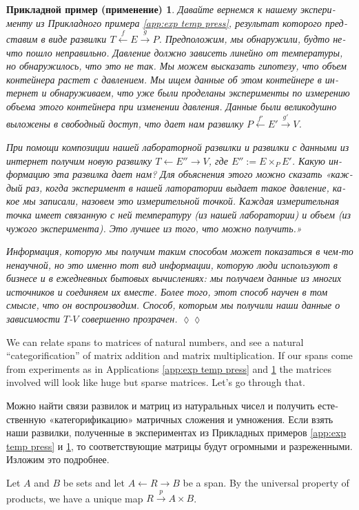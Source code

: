 \documentclass[a4paper]{book}
\def\to{\rightarrow}
\def\from{\leftarrow}
\newcommand{\To}[1]{\xrightarrow{#1}}
\newcommand{\From}[1]{\xleftarrow{#1}}
\theoremstyle{myth}
\newtheorem{appRUS}[envRUS]{Прикладной пример (применение)}
\newenvironment{applicationRUS}{\begin{appRUS}}{\hspace*{\fill}$\lozenge\lozenge$\end{appRUS}}
\begin{document}
\begin{russian}
\begin{applicationRUS}\label{app:exp temp press 2}
Давайте вернемся к нашему эксперименту из Прикладного примера \ref{app:exp temp press}, результат которого представим в виде развилки $T\From{f}E\To{g}P$. Предположим, мы обнаружили, будто нечто пошло неправильно. Давление должно зависеть линейно от температуры, но обнаружилось, что это не так. Мы можем высказать гипотезу, что объем контейнера растет с давлением. Мы ищем данные об этом контейнере в интернет и обнаруживаем, что уже были проделаны эксперименты по измерению объема этого контейнера при изменении давления. Данные были великодушно выложены в свободный доступ, что дает нам развилку $P\From{f'}E'\To{g'}V$. 

При помощи композиции нашей лабораторной развилки и развилки с данными из интернет получим новую развилку $T\from E''\to V$, где $E'':=E\times_PE'$. Какую информацию эта развилка дает нам? Для объяснения этого можно сказать «каждый раз, когда эксперимент в нашей латоратории выдает такое давление, какое мы записали, назовем это измерительной точкой. Каждая измерительная точка имеет связанную с ней температуру (из нашей лаборатории) и объем (из чужого эксперимента). Это лучшее из того, что можно получить.»

Информация, которую мы получим таким способом может показаться в чем-то ненаучной, но это именно тот вид информации, которую люди используют в бизнесе и в ежедневных бытовых вычислениях: мы получаем данные из многих источников и соединяем их вместе. Более того, этот способ научен в том смысле, что он воспроизводим. Способ, которым мы получили наши данные о зависимости $T$-$V$ совершенно прозрачен.
\end{applicationRUS}

We can relate spans to matrices of natural numbers, and see a natural “categorification” of matrix addition and matrix multiplication. If our spans come from experiments as in Applications \ref{app:exp temp press} and \ref{app:exp temp press 2} the matrices involved will look like huge but sparse matrices. Let's go through that.

Можно найти связи развилок и матриц из натуральных чисел и получить естественную «категорификацию» матричных сложения и умножения. Если взять наши развилки, полученные в экспериментах из Прикладных примеров \ref{app:exp temp press} и \ref{app:exp temp press 2}, то соответствующие матрицы будут огромными и разреженными. Изложим это подробнее.

Let $A$ and $B$ be sets and let $A\from R\to B$ be a span. By the universal property of products, we have a unique map $R\To{p}A\times B$. 


\end{russian}
\end{document}
